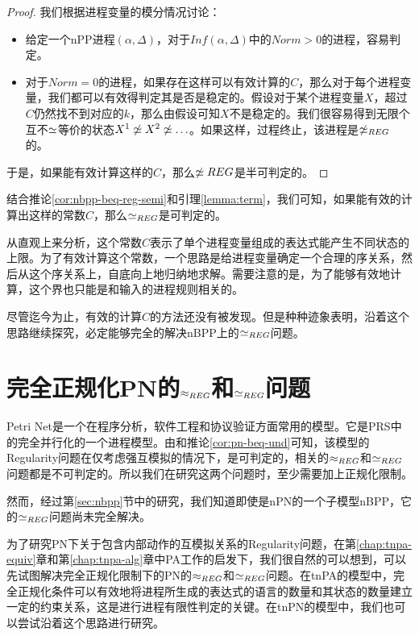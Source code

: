 \begin{proof}
我们根据进程变量的模分情况讨论：
\begin{itemize}
\item 给定一个nPP进程$(\alpha,\Delta)$，对于$Inf(\alpha,\Delta)$中的$Norm>0$的进程，容易判定。
\item 对于$Norm=0$的进程，如果存在这样可以有效计算的$C$，那么对于每个进程变量，我们都可以有效得判定其是否是稳定的。假设对于某个进程变量$X$，超过$C$仍然找不到对应的$k$，那么由假设可知$X$不是稳定的。我们很容易得到无限个互不$\simeq$等价的状态$X^1\not\simeq X^2\not\simeq\ldots$。如果这样，过程终止，该进程是$\not\simeq_{REG}$的。
\end{itemize}
于是，如果能有效计算这样的$C$，那么$\not\simeq{REG}$是半可判定的。
\end{proof}

结合推论\ref{cor:nbpp-beq-reg-semi}和引理\ref{lemma:term}，我们可知，如果能有效的计算出这样的常数$C$，那么$\simeq_{REG}$是可判定的。

从直观上来分析，这个常数$C$表示了单个进程变量组成的表达式能产生不同状态的上限。为了有效计算这个常数，一个思路是给进程变量确定一个合理的序关系，然后从这个序关系上，自底向上地归纳地求解。需要注意的是，为了能够有效地计算，这个界也只能是和输入的进程规则相关的。

尽管迄今为止，有效的计算$C$的方法还没有被发现。但是种种迹象表明，沿着这个思路继续探究，必定能够完全的解决nBPP上的$\simeq_{REG}$问题。

\section{完全正规化PN的$\approx_{REG}$和$\simeq_{REG}$问题}
\label{sec:tnPN}

Petri Net是一个在程序分析，软件工程和协议验证方面常用的模型。它是PRS中的完全并行化的一个进程模型。由\cite{Jancar1996}和推论\ref{cor:pn-beq-und}可知，该模型的Regularity问题在仅考虑强互模拟的情况下，是可判定的，相关的$\approx_{REG}$和$\simeq_{REG}$问题都是不可判定的。所以我们在研究这两个问题时，至少需要加上正规化限制。

然而，经过第\ref{sec:nbpp}节中的研究，我们知道即使是nPN的一个子模型nBPP，它的$\simeq_{REG}$问题尚未完全解决。

为了研究PN下关于包含内部动作的互模拟关系的Regularity问题，在第\ref{chap:tnpa-equiv}章和第\ref{chap:tnpa-alg}章中PA工作的启发下，我们很自然的可以想到，可以先试图解决完全正规化限制下的PN的$\approx_{REG}$和$\simeq_{REG}$问题。在tnPA的模型中，完全正规化条件可以有效地将进程所生成的表达式的语言的数量和其状态的数量建立一定的约束关系，这是进行进程有限性判定的关键。在tnPN的模型中，我们也可以尝试沿着这个思路进行研究。

